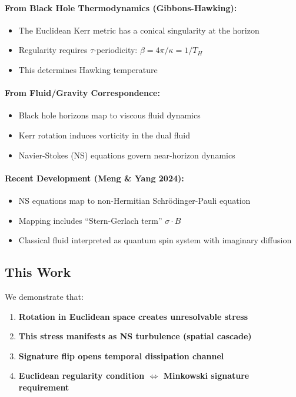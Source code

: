 \documentclass[11pt]{article}
\begin{document}
\paragraph{From Black Hole Thermodynamics (Gibbons-Hawking):}
\begin{itemize}
\item The Euclidean Kerr metric has a conical singularity at the horizon
\item Regularity requires $\tau$-periodicity: $\beta = 4\pi/\kappa = 1/T_H$
\item This determines Hawking temperature
\end{itemize}

\paragraph{From Fluid/Gravity Correspondence:}
\begin{itemize}
\item Black hole horizons map to viscous fluid dynamics
\item Kerr rotation induces vorticity in the dual fluid
\item Navier-Stokes (NS) equations govern near-horizon dynamics
\end{itemize}

\paragraph{Recent Development (Meng \& Yang 2024):}
\begin{itemize}
\item NS equations map to non-Hermitian Schrödinger-Pauli equation
\item Mapping includes ``Stern-Gerlach term'' $\sigma \cdot B$
\item Classical fluid interpreted as quantum spin system with imaginary diffusion
\end{itemize}

\subsection{This Work}

We demonstrate that:
\begin{enumerate}
\item \textbf{Rotation in Euclidean space creates unresolvable stress}
\item \textbf{This stress manifests as NS turbulence (spatial cascade)}
\item \textbf{Signature flip opens temporal dissipation channel}
\item \textbf{Euclidean regularity condition $\Leftrightarrow$ Minkowski signature requirement}
\end{enumerate}
\end{document}
